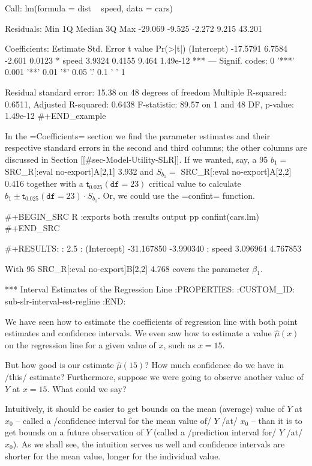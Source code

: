 Call:
lm(formula = dist ~ speed, data = cars)

Residuals:
    Min      1Q  Median      3Q     Max 
-29.069  -9.525  -2.272   9.215  43.201 

Coefficients:
            Estimate Std. Error t value Pr(>|t|)    
(Intercept) -17.5791     6.7584  -2.601   0.0123 *  
speed         3.9324     0.4155   9.464 1.49e-12 ***
---
Signif. codes:  0 '***' 0.001 '**' 0.01 '*' 0.05 '.' 0.1 ' ' 1

Residual standard error: 15.38 on 48 degrees of freedom
Multiple R-squared:  0.6511,	Adjusted R-squared:  0.6438 
F-statistic: 89.57 on 1 and 48 DF,  p-value: 1.49e-12
#+END_example

In the =Coefficients= section we find the parameter estimates and
their respective standard errors in the second and third columns; the
other columns are discussed in Section [[#sec-Model-Utility-SLR]]. If we
wanted, say, a 95%
\( b_{1} = \) SRC_R[:eval no-export]{A[2,1]} 3.932 and \( S_{b_{1}} = \) SRC_R[:eval no-export]{A[2,2]}
0.416 together with a \( \mathsf{t}_{0.025}(\mathtt{df}=23) \)
critical value to calculate \( b_{1} \pm
\mathsf{t}_{0.025}(\mathtt{df} = 23) \cdot S_{b_{1}} \).  Or, we could
use the =confint= function.

#+BEGIN_SRC R :exports both :results output pp 
confint(cars.lm)
#+END_SRC

#+RESULTS:
:                  2.5 %
: (Intercept) -31.167850 -3.990340
: speed         3.096964  4.767853

With 95%
SRC_R[:eval no-export]{B[2,2]} 4.768 covers the parameter \(\beta_{1}\).

*** Interval Estimates of the Regression Line
:PROPERTIES:
:CUSTOM_ID: sub-slr-interval-est-regline
:END:

We have seen how to estimate the coefficients of regression line with
both point estimates and confidence intervals. We even saw how to
estimate a value \(\hat{\mu}(x)\) on the regression line for a given
value of \(x\), such as \(x=15\).

But how good is our estimate \(\hat{\mu}(15)\)? How much confidence do
we have in /this/ estimate? Furthermore, suppose we were going to
observe another value of \(Y\) at \(x=15\). What could we say?

Intuitively, it should be easier to get bounds on the mean (average)
value of \(Y\) at \(x_{0}\) -- called a /confidence interval for the
mean value of/ \(Y\) /at/ \(x_{0}\) -- than it is to get bounds on a
future observation of \(Y\) (called a /prediction interval for/ \(Y\)
/at/ \(x_{0}\)). As we shall see, the intuition serves us well and
confidence intervals are shorter for the mean value, longer for the
individual value.

